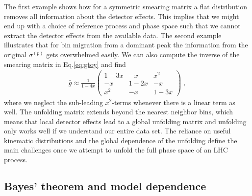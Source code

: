 %
The first example shows how for a symmetric smearing matrix a flat
distribution removes all information about the detector effects. This
implies that we might end up with a choice of reference
process and phase space such that we cannot extract the
detector effects from the available data. The second example
illustrates that for bin migration from a dominant peak the
information from the original $\sigma^{(p)}$ gets overwhelmed
easily. We can also compute the inverse of the smearing matrix in
Eq.\eqref{eq:gtoy} and find
%
\begin{align}
  \bar{g}
  \approx \frac{1}{1-4x}
  \begin{pmatrix}
  1-3x & -x & x^2 \\ -x & 1-2x & -x \\ x^2 & -x & 1-3x
  \end{pmatrix} \; ,
\end{align}
%
where we neglect the sub-leading $x^2$-terms whenever there is a
linear term as well. The unfolding matrix extends beyond the nearest
neighbor bins, which means that local detector effects lead to a
global unfolding matrix and unfolding only works well if we understand
our entire data set. The reliance on useful kinematic distributions
and the global dependence of the unfolding define the main challenges
once we attempt to unfold the full phase space of an LHC process.

\subsection{Bayes' theorem and model dependence}
\label{sec:basics_model}


